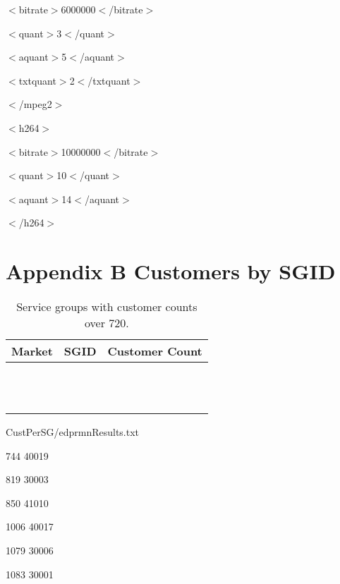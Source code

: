 \documentclass{article}
\begin{document}
$<$bitrate$>$6000000$<$/bitrate$>$

$<$quant$>$3$<$/quant$>$

$<$aquant$>$5$<$/aquant$>$

$<$txtquant$>$2$<$/txtquant$>$

$<$/mpeg2$>$

$<$h264$>$

$<$bitrate$>$10000000$<$/bitrate$>$

$<$quant$>$10$<$/quant$>$

$<$aquant$>$14$<$/aquant$>$

$<$/h264$>$


\newpage


\section{Appendix B\: Customers by SGID}
\label{APPENDIX-CustBySGID}




\begin{table}
\begin{tabular}{|l|l|l|} 
\hline Market & SGID & Customer Count \\
\hline  &  &  \\  
\hline  &  &  \\
\hline  &  &  \\
\hline  &  &  \\
\hline  &  &  \\
\hline  &  &  \\
\hline  &  &  \\
\hline  &  &  \\
\hline  &  &  \\
\hline  &  &  \\
\hline  &  &  \\
\hline  &  &  \\
\hline 
\end{tabular}
\caption{\label{TABLE-HighSGUse} Service groups with customer counts over 720.} 
\end{table}



CustPerSG/edprmnResults.txt

    744 40019 

    819 30003 

    850 41010 

   1006 40017 

   1079 30006 

   1083 30001 
\end{document}
